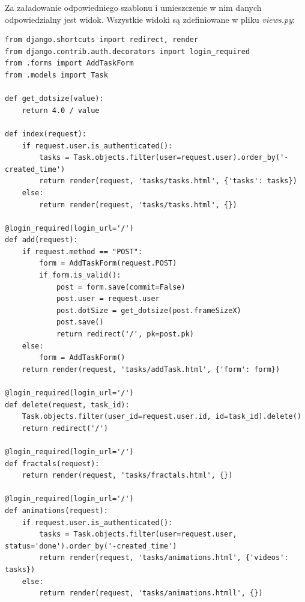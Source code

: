 \documentclass[a4paper]{article}
\begin{document}
Za załadowanie odpowiedniego szablonu i umieszczenie w nim danych odpowiedzialny jest widok. Wszystkie widoki są zdefiniowane w pliku \textit{views.py}:
\begin{lstlisting}
from django.shortcuts import redirect, render
from django.contrib.auth.decorators import login_required
from .forms import AddTaskForm
from .models import Task

def get_dotsize(value):
    return 4.0 / value

def index(request):
    if request.user.is_authenticated():
        tasks = Task.objects.filter(user=request.user).order_by('-created_time')
        return render(request, 'tasks/tasks.html', {'tasks': tasks})
    else:
        return render(request, 'tasks/tasks.html', {})

@login_required(login_url='/')
def add(request):
    if request.method == "POST":
        form = AddTaskForm(request.POST)
        if form.is_valid():
            post = form.save(commit=False)
            post.user = request.user
            post.dotSize = get_dotsize(post.frameSizeX)
            post.save()
            return redirect('/', pk=post.pk)
    else:
        form = AddTaskForm()
    return render(request, 'tasks/addTask.html', {'form': form})

@login_required(login_url='/')
def delete(request, task_id):
    Task.objects.filter(user_id=request.user.id, id=task_id).delete()
    return redirect('/')

@login_required(login_url='/')
def fractals(request):
    return render(request, 'tasks/fractals.html', {})

@login_required(login_url='/')
def animations(request):
    if request.user.is_authenticated():
        tasks = Task.objects.filter(user=request.user, status='done').order_by('-created_time')
        return render(request, 'tasks/animations.html', {'videos': tasks})
    else:
        return render(request, 'tasks/animations.htmll', {})
\end{lstlisting}
\end{document}
